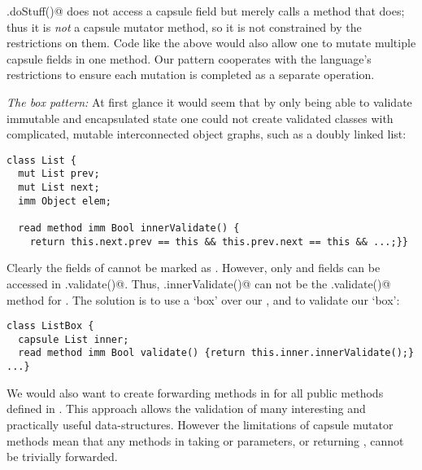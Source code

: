 
\Q@.doStuff()@ does not access a capsule field but merely calls a method that does; thus
it is \emph{not} a capsule mutator method, so it is not constrained by the restrictions on them. Code like the above would also allow one to mutate multiple capsule fields in one method.
Our pattern cooperates with the language’s restrictions to ensure each mutation is completed as a separate operation.%


\loseSpace
\noindent\textit{The box pattern:}
At first glance it would seem that by only being able to validate immutable and encapsulated state one could not create validated classes with complicated, mutable interconnected object graphs, such as a doubly linked list:
\begin{lstlisting}[escapechar=\%]
class List {
  mut List prev;
  mut List next;
  imm Object elem;
  
  read method imm Bool innerValidate() {
    return this.next.prev == this && this.prev.next == this && ...;}}
\end{lstlisting}
Clearly the \Q@mut@ fields of \Q@List@ cannot be marked as \Q@capsule@.
However, only \Q@capsule@ and \Q@imm@
fields can be accessed in \Q@.validate()@.
Thus, \Q@.innerValidate()@ can not be the \Q@.validate()@ method for \Q@List@.
The solution is to use a `box' over our \Q@List@, and to validate our `box':

\loseSpace\loseSpace\loseSpace
\begin{lstlisting}[escapechar=\%]
class ListBox { 
  capsule List inner;
  read method imm Bool validate() {return this.inner.innerValidate();}
...}
\end{lstlisting}
\saveSpace
We would also want to create forwarding methods in \Q@ListBox@ for all public methods defined in \Q@List@. This approach allows the validation of many interesting and practically useful data-structures.
However the limitations of capsule mutator methods mean that any \Q@mut@ methods in \Q@ListBox@ taking \Q@read@ or \Q@mut@ parameters, or returning \Q@mut@, cannot be trivially forwarded.

